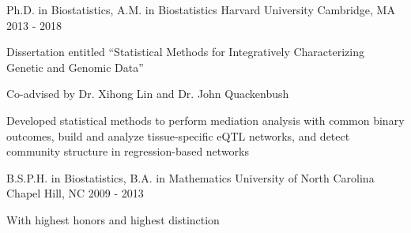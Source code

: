 

\begin{cventries}

  \cventry
    {Ph.D. in Biostatistics, A.M. in Biostatistics} %
    {Harvard University} %
    {Cambridge, MA} %
    {2013 - 2018} %
    {
      \begin{cvitems} %
        \item {Dissertation entitled ``Statistical Methods for Integratively Characterizing Genetic and Genomic Data''}
        \item {Co-advised by Dr. Xihong Lin and Dr. John Quackenbush}
        \item {Developed statistical methods to perform mediation analysis with common binary outcomes, build and analyze tissue-specific eQTL networks, and detect community structure in regression-based networks }
      \end{cvitems}
    }
    
    \cventry
    {B.S.P.H. in Biostatistics, B.A. in Mathematics} %
    {University of North Carolina} %
    {Chapel Hill, NC} %
    {2009 - 2013} %
    {
      \begin{cvitems} %
        \item {With highest honors and highest distinction}
      \end{cvitems}
    }
\end{cventries}
